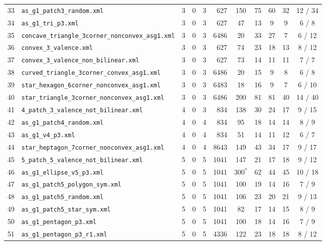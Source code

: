 \documentclass[10pt,a4paper]{article}
\begin{document}
{\begin{longtable}{@{}rlrrrrccccc@{}}
33 & \texttt{as\_g1\_patch3\_random.xml} & 3 & 0 & 3 & 627 & 150 & 75 & 60 & 32 & 12 / 34 \\
34 & \texttt{as\_g1\_tri\_p3.xml} & 3 & 0 & 3 & 627 & 47 & 13 & 9 & 9 & 6 / 8 \\
35 & \texttt{concave\_triangle\_3corner\_nonconvex\_asg1.xml} & 3 & 0 & 3 & 6486 & 20 & 33 & 27 & 7 & 6 / 12 \\
36 & \texttt{convex\_3\_valence.xml} & 3 & 0 & 3 & 627 & 74 & 23 & 18 & 13 & 8 / 12 \\
37 & \texttt{convex\_3\_valence\_non\_bilinear.xml} & 3 & 0 & 3 & 627 & 73 & 14 & 11 & 11 & 7 / 7 \\
38 & \texttt{curved\_triangle\_3corner\_convex\_asg1.xml} & 3 & 0 & 3 & 6486 & 20 & 15 & 9 & 8 & 6 / 8 \\
39 & \texttt{star\_hexagon\_6corner\_nonconvex\_asg1.xml} & 3 & 0 & 3 & 6483 & 18 & 16 & 9 & 7 & 6 / 10 \\
40 & \texttt{star\_triangle\_3corner\_nonconvex\_asg1.xml} & 3 & 0 & 3 & 6486 & 200 & 81 & 81 & 40 & 14 / 40 \\
41 & \texttt{4\_patch\_3\_valence\_not\_bilinear.xml} & 4 & 0 & 3 & 834 & 138 & 30 & 24 & 17 & 9 / 15 \\
42 & \texttt{as\_g1\_patch4\_random.xml} & 4 & 0 & 4 & 834 & 95 & 18 & 14 & 14 & 8 / 9 \\
43 & \texttt{as\_g1\_v4\_p3.xml} & 4 & 0 & 4 & 834 & 51 & 14 & 11 & 12 & 6 / 7 \\
44 & \texttt{star\_heptagon\_7corner\_nonconvex\_asg1.xml} & 4 & 0 & 4 & 8643 & 149 & 43 & 34 & 17 & 9 / 17 \\
45 & \texttt{5\_patch\_5\_valence\_not\_bilinear.xml} & 5 & 0 & 5 & 1041 & 147 & 21 & 17 & 18 & 9 / 12 \\
46 & \texttt{as\_g1\_ellipse\_v5\_p3.xml} & 5 & 0 & 5 & 1041 & 300$^*$ & 62 & 44 & 45 & 10 / 18 \\
47 & \texttt{as\_g1\_patch5\_polygon\_sym.xml} & 5 & 0 & 5 & 1041 & 100 & 19 & 14 & 16 & 7 / 9 \\
48 & \texttt{as\_g1\_patch5\_random.xml} & 5 & 0 & 5 & 1041 & 106 & 23 & 20 & 21 & 9 / 13 \\
49 & \texttt{as\_g1\_patch5\_star\_sym.xml} & 5 & 0 & 5 & 1041 & 82 & 17 & 14 & 15 & 8 / 9 \\
50 & \texttt{as\_g1\_pentagon\_p3.xml} & 5 & 0 & 5 & 1041 & 100 & 18 & 14 & 16 & 7 / 9 \\
51 & \texttt{as\_g1\_pentagon\_p3\_r1.xml} & 5 & 0 & 5 & 4336 & 122 & 23 & 18 & 18 & 8 / 12 \\

\end{longtable}}
\end{document}
